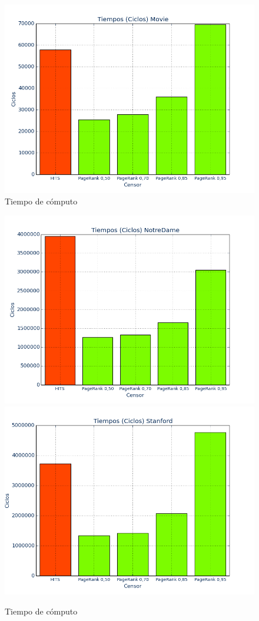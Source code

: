 \documentclass[a4paper]{article}
\begin{document}
\begin{figure}[htbp]
\includegraphics[scale=0.25]{img/Tiempos-Movie.png}
\caption{Tiempo de cómputo}
\end{figure}

\begin{figure}[htbp]
\centering
\includegraphics[scale=0.385]{img/Tiempos-Notre.png}
\includegraphics[scale=0.385]{img/Tiempo-Stanford.png}
\caption{Tiempo de cómputo}
\end{figure}
\end{document}
